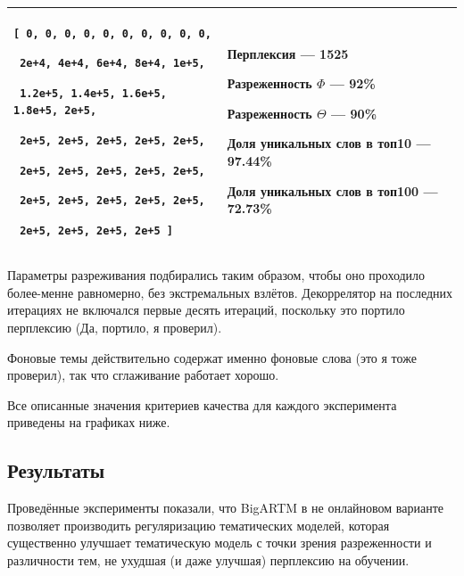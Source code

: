 \begin{tabular}[t]{|p{29em}|p{12em}|}
				\verb|[ 0, 0, 0, 0, 0, 0, 0, 0, 0, 0, | 

				  \verb| 2e+4, 4e+4, 6e+4, 8e+4, 1e+5,| 
				  
	                 \verb| 1.2e+5, 1.4e+5, 1.6e+5, 1.8e+5, 2e+5,|
	                 
	                 \verb| 2e+5, 2e+5, 2e+5, 2e+5, 2e+5, |
	                 
	                 \verb| 2e+5, 2e+5, 2e+5, 2e+5, 2e+5, | 
	                 
	                 \verb| 2e+5, 2e+5, 2e+5, 2e+5, 2e+5, |
	                 
	                 \verb| 2e+5, 2e+5, 2e+5, 2e+5 ] |

\vspace{4pt}
&
\vspace{4pt}

Перплексия --- 1525

Разреженность $\Phi$ --- 92\%

Разреженность $\Theta$ --- 90\%

Доля уникальных слов в топ10 --- 97.44\%

Доля уникальных слов в топ100 --- 72.73\%

\vspace{4pt}

\\
\hline
\end{tabular}

\vspace{10pt}

Параметры разреживания подбирались таким образом, чтобы оно проходило более-менне равномерно, без экстремальных взлётов. Декоррелятор на последних итерациях не включался первые десять итераций, поскольку это портило перплексию (Да, портило, я проверил). 

Фоновые темы действительно содержат именно фоновые слова (это я тоже проверил), так что сглаживание работает хорошо.

Все описанные значения критериев качества для каждого эксперимента приведены на графиках ниже.

\subsection{Результаты}

Проведённые эксперименты показали, что BigARTM в не онлайновом варианте позволяет производить регуляризацию тематических моделей, которая существенно улучшает тематическую модель с точки зрения разреженности и различности  тем, не ухудшая (и даже улучшая) перплексию на обучении.

